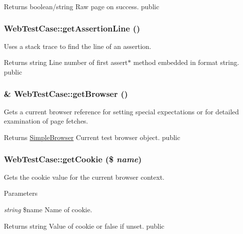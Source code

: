 \begin{DoxyReturn}{Returns}
boolean/string Raw page on success.  public 
\end{DoxyReturn}
\hypertarget{class_web_test_case_a4fa60ab738d6c9ada4a4199698549fd2}{
\subsubsection[{getAssertionLine}]{\setlength{\rightskip}{0pt plus 5cm}WebTestCase::getAssertionLine ()}}
\label{class_web_test_case_a4fa60ab738d6c9ada4a4199698549fd2}
Uses a stack trace to find the line of an assertion. \begin{DoxyReturn}{Returns}
string Line number of first assert$\ast$ method embedded in format string.  public 
\end{DoxyReturn}
\hypertarget{class_web_test_case_ad7ef0640edd1ef69ee201cb661ed5935}{
\subsubsection[{getBrowser}]{\setlength{\rightskip}{0pt plus 5cm}\& WebTestCase::getBrowser ()}}
\label{class_web_test_case_ad7ef0640edd1ef69ee201cb661ed5935}
Gets a current browser reference for setting special expectations or for detailed examination of page fetches. \begin{DoxyReturn}{Returns}
\hyperlink{class_simple_browser}{SimpleBrowser} Current test browser object.  public 
\end{DoxyReturn}
\hypertarget{class_web_test_case_a104b5a93fe99f66cef9c170066e4c19e}{
\subsubsection[{getCookie}]{\setlength{\rightskip}{0pt plus 5cm}WebTestCase::getCookie (\$ {\em name})}}
\label{class_web_test_case_a104b5a93fe99f66cef9c170066e4c19e}
Gets the cookie value for the current browser context. 
\begin{DoxyParams}{Parameters}
\item[{\em string}]\$name Name of cookie. \end{DoxyParams}
\begin{DoxyReturn}{Returns}
string Value of cookie or false if unset.  public 
\end{DoxyReturn}
